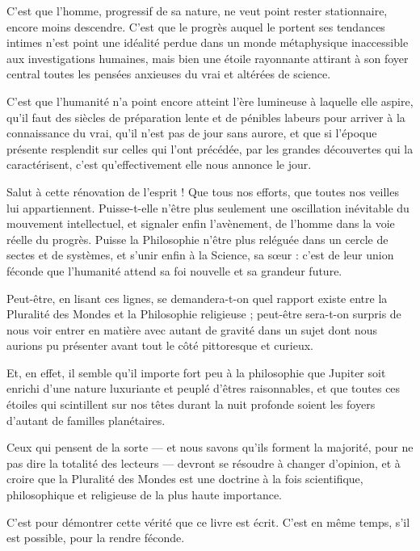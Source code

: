 \documentclass[a4paper, 11pt, oneside, landscape]{article}
\begin{document}
C'est que l'homme, progressif de sa nature, ne veut point rester stationnaire, encore moins descendre. C'est que le progrès auquel le portent ses tendances intimes n'est point une idéalité perdue dans un monde métaphysique inaccessible aux investigations humaines, mais bien une étoile rayonnante attirant à son foyer central toutes les pensées anxieuses du vrai et altérées de science.

C'est que l'humanité n'a point encore atteint l'ère lumineuse à laquelle elle aspire, qu'il faut des siècles de préparation lente et de pénibles labeurs pour arriver à la connaissance du vrai, qu'il n'est pas de jour sans aurore, et que si l'époque présente resplendit sur celles qui l'ont précédée, par les grandes découvertes qui la caractérisent, c'est qu'effectivement elle nous annonce le jour.

Salut à cette rénovation de l'esprit ! Que tous nos efforts, que toutes nos veilles lui appartiennent. Puisse-t-elle n'être plus seulement une oscillation inévitable du mouvement intellectuel, et signaler enfin l'avènement, de l'homme dans la voie réelle du progrès. Puisse la Philosophie n'être plus reléguée dans un cercle de sectes et de systèmes, et s'unir enfin à la Science, sa sœur : c'est de leur union féconde que l'humanité attend sa foi nouvelle et sa grandeur future.

Peut-être, en lisant ces lignes, se demandera-t-on quel rapport existe entre la Pluralité des Mondes et la Philosophie religieuse ; peut-être sera-t-on surpris de nous voir entrer en matière avec autant de gravité dans un sujet dont nous aurions pu présenter avant tout le côté pittoresque et curieux.

Et, en effet, il semble qu'il importe fort peu à la philosophie que Jupiter soit enrichi d'une nature luxuriante et peuplé d'êtres raisonnables, et que toutes ces étoiles qui scintillent sur nos têtes durant la nuit profonde soient les foyers d'autant de familles planétaires.

Ceux qui pensent de la sorte --- et nous savons qu'ils forment la majorité, pour ne pas dire la totalité des lecteurs --- devront se résoudre à changer d'opinion, et à croire que la Pluralité des Mondes est une doctrine à la fois scientifique, philosophique et religieuse de la plus haute importance.

C'est pour démontrer cette vérité que ce livre est écrit. C'est en même temps, s'il est possible, pour la rendre féconde.
\end{document}
